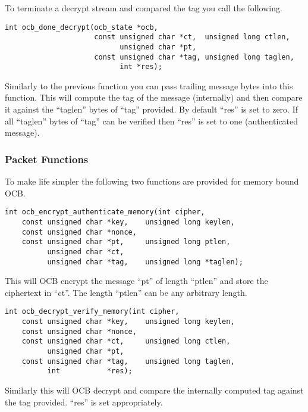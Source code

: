 \documentclass[a4paper]{book}
\begin{document}
To terminate a decrypt stream and compared the tag you call the following.

\begin{verbatim}
int ocb_done_decrypt(ocb_state *ocb, 
                     const unsigned char *ct,  unsigned long ctlen,
                           unsigned char *pt, 
                     const unsigned char *tag, unsigned long taglen, 
                           int *res);
\end{verbatim}

Similarly to the previous function you can pass trailing message bytes into this function.  This will compute the 
tag of the message (internally) and then compare it against the ``taglen'' bytes of ``tag'' provided.  By default
``res'' is set to zero.  If all ``taglen'' bytes of ``tag'' can be verified then ``res'' is set to one (authenticated
message).

\subsubsection{Packet Functions}
To make life simpler the following two functions are provided for memory bound OCB.

\begin{verbatim}
int ocb_encrypt_authenticate_memory(int cipher,
    const unsigned char *key,    unsigned long keylen,
    const unsigned char *nonce,  
    const unsigned char *pt,     unsigned long ptlen,
          unsigned char *ct,
          unsigned char *tag,    unsigned long *taglen);
\end{verbatim}

This will OCB encrypt the message ``pt'' of length ``ptlen'' and store the ciphertext in ``ct''.  The length ``ptlen''
can be any arbitrary length.  

\begin{verbatim}
int ocb_decrypt_verify_memory(int cipher,
    const unsigned char *key,    unsigned long keylen,
    const unsigned char *nonce,  
    const unsigned char *ct,     unsigned long ctlen,
          unsigned char *pt,
    const unsigned char *tag,    unsigned long taglen,
          int           *res);
\end{verbatim}

Similarly this will OCB decrypt and compare the internally computed tag against the tag provided. ``res'' is set 
appropriately.
\end{document}
